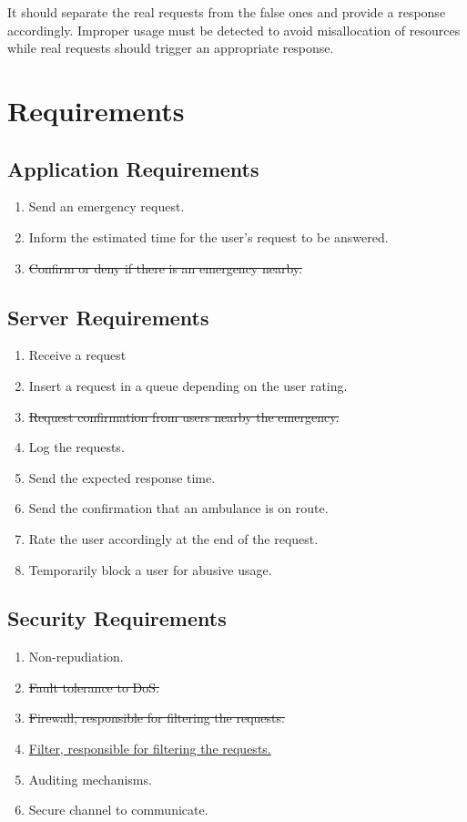\documentclass[a4paper,titlepage,11pt]{article}
\begin{document}
It should separate the real requests from the false ones and provide a response accordingly.
Improper usage must be detected to avoid misallocation of resources while real requests should
trigger an appropriate response.

\section{Requirements}

\subsection{Application Requirements}
\begin{enumerate}
  \item Send an emergency request.
  \item Inform the estimated time for the user's request to be answered.
  \item \st{Confirm or deny if there is an emergency nearby.}
\end{enumerate}

\subsection{Server Requirements}
\begin{enumerate}
  \item Receive a request
  \item Insert a request in a queue depending on the user rating.
  \item \st{Request confirmation from users nearby the emergency.}
  \item Log the requests.
  \item Send the expected response time.
  \item Send the confirmation that an ambulance is on route.
  \item Rate the user accordingly at the end of the request.
  \item Temporarily block a user for abusive usage.
\end{enumerate}

\subsection{Security Requirements}
\begin{enumerate}
  \item Non-repudiation.
  \item \st{Fault tolerance to DoS.}
  \item \st{Firewall, responsible for filtering the requests.}
  \item \underline{Filter, responsible for filtering the requests.}
  \item Auditing mechanisms.
  \item Secure channel to communicate.
\end{enumerate}
\end{document}
